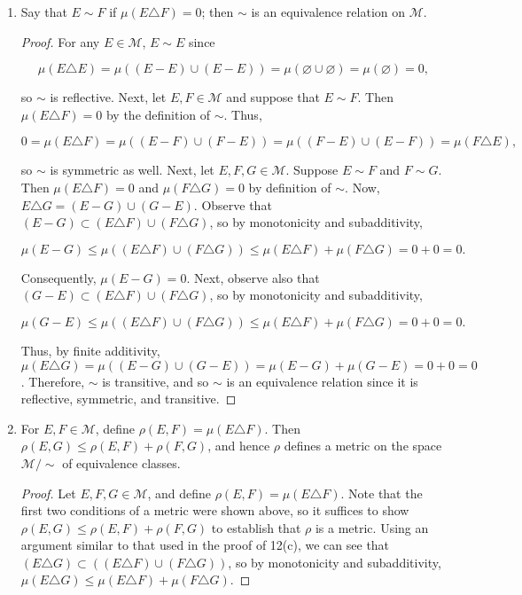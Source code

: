 \documentclass[11pt,oneside,english]{amsart}
\theoremstyle{definition}
\newcommand{\MC}[1]{\mathcal{#1}}
\begin{document}
\begin{enumerate}
\begin{enumerate}
\begin{proof}
which can only be true if $\mu(F-E)<0$, a contradiction. Consequently, $\mu(E-F)=0$. A similar argument reveals that $\mu(F-E)=0$ as well, thus

\[
\mu(E)-\mu(F)=\mu(E-F)-\mu(F-E)=0-0=0,
\]

and therefore $\mu(E)=\mu(F)$.
\end{proof}


\item Say that $E\sim F$ if $\mu(E\triangle F)=0$; then $\sim$ is an equivalence relation on $\MC{M}$.

\begin{proof}
For any $E\in\MC{M}$, $E\sim E$ since

\[
\mu(E\triangle E)=\mu((E-E)\cup(E-E))=\mu(\varnothing\cup\varnothing)=\mu(\varnothing)=0,
\]

so $\sim$ is reflective. Next, let $E,F\in\MC{M}$ and suppose that $E\sim F$. Then $\mu(E\triangle F)=0$ by the definition of $\sim$. Thus,

\[
0=\mu(E\triangle F)=\mu((E-F)\cup(F-E))=\mu((F-E)\cup(E-F))=\mu(F\triangle E),
\]

so $\sim$ is symmetric as well. Next, let $E,F,G\in\MC{M}$. Suppose $E\sim F$ and $F\sim G$. Then $\mu(E\triangle F)=0$ and $\mu(F\triangle G)=0$ by definition of $\sim$. Now, $E\triangle G=(E-G)\cup(G-E)$. Observe that $(E-G)\subset(E\triangle F)\cup(F\triangle G)$, so by monotonicity and subadditivity,

\[
\mu(E-G)\leq\mu((E\triangle F)\cup(F\triangle G))\leq \mu(E\triangle F)+\mu(F\triangle G)=0+0=0.
\]

Consequently, $\mu(E-G)=0$. Next, observe also that $(G-E)\subset(E\triangle F)\cup(F\triangle G)$, so by monotonicity and subadditivity,

\[
\mu(G-E)\leq\mu((E\triangle F)\cup(F\triangle G))\leq \mu(E\triangle F)+\mu(F\triangle G)=0+0=0.
\]

Thus, by finite additivity, $\mu(E\triangle G)=\mu((E-G)\cup(G-E))=\mu(E-G)+\mu(G-E)=0+0=0$. Therefore, $\sim$ is transitive, and so $\sim$ is an equivalence relation since it is reflective, symmetric, and transitive.
\end{proof}

\item For $E,F\in\MC{M}$, define $\rho(E,F)=\mu(E\triangle F)$. Then $\rho(E,G)\leq\rho(E,F)+\rho(F,G)$, and hence $\rho$ defines a metric on the space $\MC{M}/\sim$ of equivalence classes.

\begin{proof}
Let $E,F,G\in\MC{M}$, and define $\rho(E,F)=\mu(E\triangle F)$. Note that the first two conditions of a metric were shown above, so it suffices to show $\rho(E,G)\leq\rho(E,F)+\rho(F,G)$ to establish that $\rho$ is a metric. Using an argument similar to that used in the proof of 12(c), we can see that $(E\triangle G)\subset((E\triangle F)\cup(F\triangle G))$, so by monotonicity and subadditivity, $\mu(E\triangle G)\leq \mu(E\triangle F)+\mu(F\triangle G)$.
\end{proof}


\end{enumerate}

\end{enumerate}
\end{document}
